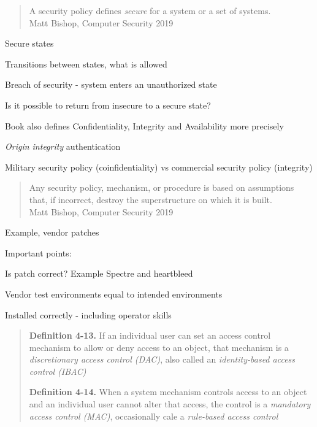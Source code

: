 \documentclass[Screen16to9,17pt]{foils}
\begin{document}

\begin{quote}
A security policy defines \emph{secure} for a system or a set of systems.\\
Matt Bishop, Computer Security 2019
\end{quote}

\begin{list1}
\item Secure states
\item Transitions between states, what is allowed
\item Breach of security - system enters an unauthorized state
\item Is it possible to return from insecure to a secure state?
\item Book also defines Confidentiality, Integrity and Availability more precisely
\item \emph{Origin integrity} authentication
\item Military security policy (coinfidentiality) vs commercial security policy (integrity)
\end{list1}


\begin{quote}
Any security policy, mechanism, or procedure is based on assumptions that, if incorrect, destroy the superstructure on which it is built.\\
Matt Bishop, Computer Security 2019
\end{quote}

\begin{list1}
\item Example, vendor patches
\item Important points:
\begin{list2}
\item Is patch correct? Example Spectre and heartbleed
\item Vendor test environments equal to intended environments
\item Installed correctly - including operator skills
\end{list2}
\end{list1}


\begin{quote}
{\bf Definition 4-13.} If an individual user can set an access control mechanism to allow or deny access to an object, that mechanism is a \emph{discretionary access control (DAC)}, also called an \emph{identity-based access control (IBAC)}

{\bf Definition 4-14.}  When a system mechanism controls access to an object and an individual user cannot alter that access, the control is a \emph{mandatory access control (MAC)}, occasionally cale a \emph{rule-based access control}
\end{quote}
\end{document}
